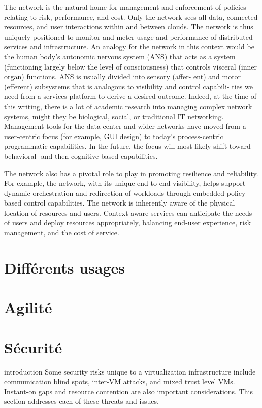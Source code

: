 The network is the natural home for management and enforcement of policies relating to risk, performance, and cost. Only the network sees all data, connected resources, and user interactions within and between clouds. The network is thus uniquely positioned to monitor and meter usage and performance of distributed services and infrastructure. An analogy for the network in this context would be the human body’s autonomic nervous system (ANS) that acts as a system (functioning largely below the level of consciousness) that controls visceral (inner organ) functions. ANS is usually divided into sensory (affer- ent) and motor (efferent) subsystems that is analogous to visibility and control capabili- ties we need from a services platform to derive a desired outcome. Indeed, at the time of this writing, there is a lot of academic research into managing complex network systems, might they be biological, social, or traditional IT networking. Management tools for the data center and wider networks have moved from a user-centric focus (for example, GUI design) to today’s process-centric programmatic capabilities. In the future, the focus will most likely shift toward behavioral- and then cognitive-based capabilities.

The network also has a pivotal role to play in promoting resilience and reliability. For example, the network, with its unique end-to-end visibility, helps support dynamic orchestration and redirection of workloads through embedded policy-based control capabilities. The network is inherently aware of the physical location of resources and users. Context-aware services can anticipate the needs of users and deploy resources appropriately, balancing end-user experience, risk management, and the cost of service.


\section{Différents usages}

\section{Agilité}

\section{Sécurité}

introduction
Some security risks unique to a virtualization infrastructure include communication blind spots, inter-VM attacks, and mixed trust level VMs. Instant-on gaps and resource contention are also important considerations. This section addresses each of these threats and issues.

